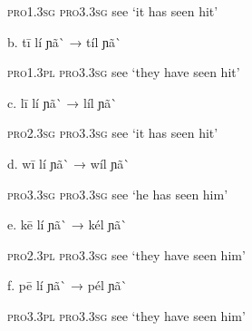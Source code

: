 \begin{styleindexi}
            \textsc{pro1.3sg}     \textsc{pro3.3sg}      see                       ‘it has seen hit’
\end{styleindexi}

\begin{styleindexi}
      b.    tī               lí                  ɲã\`{}              →        tíl ɲã\`{}   
\end{styleindexi}

\begin{styleindexi}
            \textsc{pro1.3pl}     \textsc{pro3.3sg}      see                       ‘they have seen hit’ 
\end{styleindexi}

\begin{styleindexi}
      c.    lī                lí                  ɲã\`{}               →        líl  ɲã\`{}   
\end{styleindexi}

\begin{styleindexi}
            \textsc{pro2.3sg}     \textsc{pro3.3sg}      see                      ‘it has seen hit’
\end{styleindexi}

\begin{styleindexi}
      d.    wī              lí                  ɲã\`{}               →        wíl ɲã\`{} 
\end{styleindexi}

\begin{styleindexi}
            \textsc{pro3.3sg}     \textsc{pro3.3sg}      see                      ‘he has seen him’
\end{styleindexi}

\begin{styleindexi}
      e.    kē              lí                  ɲã\`{}               →        kél ɲã\`{} 
\end{styleindexi}

\begin{styleindexi}
            \textsc{pro2.3pl}       \textsc{pro3.3sg}    see                       ‘they have seen him’
\end{styleindexi}

\begin{styleindexi}
      f.      pē              lí                  ɲã\`{}               →        pél ɲã\`{} 
\end{styleindexi}

\begin{styleindexi}
            \textsc{pro3.3pl}     \textsc{pro3.3sg}      see                      ‘they have seen him’ 
\end{styleindexi}

